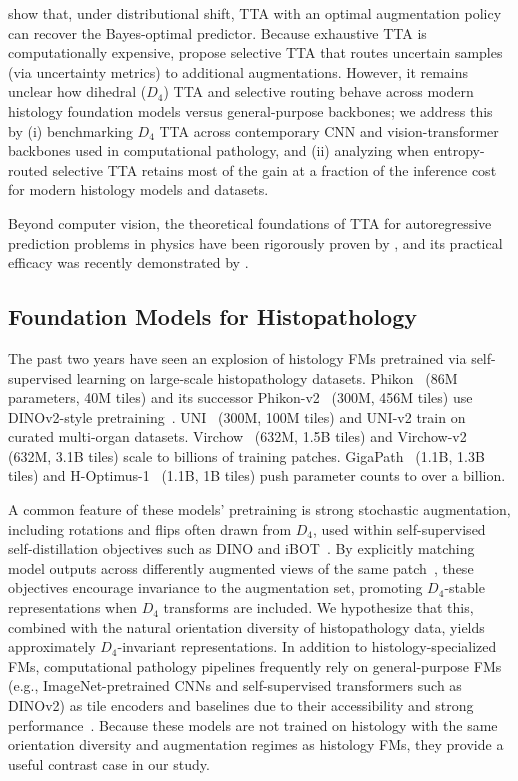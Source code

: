 \documentclass{melba}
\begin{document}
\citet{shanmugam2021better} show that, under distributional shift, TTA with an optimal augmentation policy can recover the Bayes-optimal predictor. Because exhaustive TTA is computationally expensive, \citet{son2023efficient} propose selective TTA that routes uncertain samples (via uncertainty metrics) to additional augmentations. However, it remains unclear how dihedral ($D_4$) TTA and selective routing behave across modern histology foundation models versus general-purpose backbones; we address this by (i) benchmarking $D_4$ TTA across contemporary CNN and vision-transformer backbones used in computational pathology, and (ii) analyzing when entropy-routed selective TTA retains most of the gain at a fraction of the inference cost for modern histology models and datasets.

Beyond computer vision, the theoretical foundations of TTA for autoregressive prediction problems in physics have been rigorously proven by \citet{elesedy2021provably}, and its practical efficacy was recently demonstrated by \citet{foit2025group}.


\subsection{Foundation Models for Histopathology}

The past two years have seen an explosion of histology FMs pretrained via self-supervised learning on large-scale histopathology datasets. Phikon~\citep{filiot2023phikon} (86M parameters, 40M tiles) and its successor Phikon-v2~\citep{filiot2024phikon2} (300M, 456M tiles) use DINOv2-style pretraining~\citep{oquab2023dinov2}. UNI~\citep{chen2024uni} (300M, 100M tiles) and UNI-v2 train on curated multi-organ datasets. Virchow~\citep{vorontsov2024virchow} (632M, 1.5B tiles) and Virchow-v2 (632M, 3.1B tiles) scale to billions of training patches. GigaPath~\citep{xu2024gigapath} (1.1B, 1.3B tiles) and H-Optimus-1~\citep{hoptimus2024} (1.1B, 1B tiles) push parameter counts to over a billion.

A common feature of these models' pretraining is strong stochastic augmentation, including rotations and flips often drawn from $D_4$, used within self-supervised self-distillation objectives such as DINO and iBOT~\citep{caron2021dino,oquab2023dinov2,zhou2021ibot}. By explicitly matching model outputs across differently augmented views of the same patch~\citep{caron2021dino,zhou2021ibot}, these objectives encourage invariance to the augmentation set, promoting $D_4$-stable representations when $D_4$ transforms are included. We hypothesize that this, combined with the natural orientation diversity of histopathology data, yields approximately $D_4$-invariant representations.
In addition to histology-specialized FMs, computational pathology pipelines frequently rely on general-purpose FMs (e.g., ImageNet-pretrained CNNs and self-supervised transformers such as DINOv2) as tile encoders and baselines due to their accessibility and strong performance~\citep{lu2021clam,zhao2025smmile,oquab2023dinov2}. Because these models are not trained on histology with the same orientation diversity and augmentation regimes as histology FMs, they provide a useful contrast case in our study.
\end{document}

